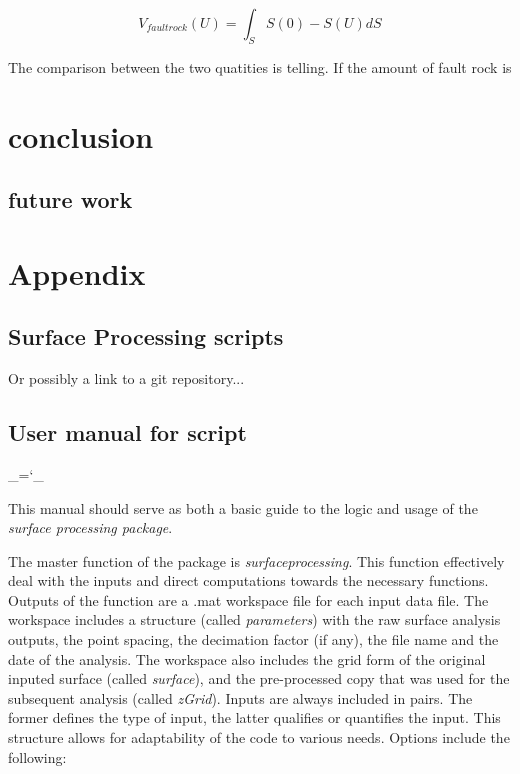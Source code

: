 \documentclass[12pt,a4paper]{article}
\begin{document}
\begin{itemize}
\begin{equation}
	V_{fault rock}(U) = \int_S S(0)-S(U)dS
\end{equation}

The comparison between the two quatities is telling. If the amount of fault rock is

\section{conclusion}
	\subsection{future work}

\section{Appendix}

\subsection{Surface Processing scripts}

Or possibly a link to a git repository...

\subsection{User manual for script}

\chardef\_=`_

This manual should serve as both a basic guide to the logic and usage of the \textit{surface processing package}. 

The master function of the package is \textit{surfaceprocessing}. This function effectively deal with the inputs and direct computations towards the necessary functions. Outputs of the function are a .mat workspace file for each input data file. The workspace includes a structure (called \textit{parameters}) with the raw surface analysis outputs, the point spacing, the decimation factor (if any), the file name and the date of the analysis. The workspace also includes the grid form of the original inputed surface (called \textit{surface}), and the pre-processed copy that was used for the subsequent analysis (called \textit{zGrid}).  Inputs are always included in pairs. The former defines the type of input, the latter qualifies or quantifies the input. This structure allows for adaptability of the code to various needs. Options include the following:


\end{itemize}
\end{document}
